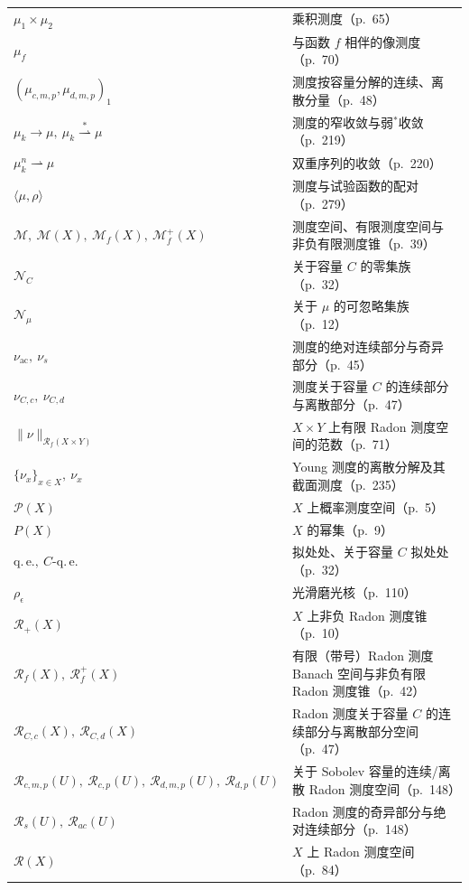 \documentclass[../main.tex]{subfiles}
\begin{document}
\begin{longtable}{p{}p{}}
$\mu_1\times\mu_2$ & 乘积测度（p.~65）\\
$\mu_f$ & 与函数 $f$ 相伴的像测度（p.~70）\\
$(\mu_{c,m,p},\mu_{d,m,p})_1$ & 测度按容量分解的连续、离散分量（p.~48）\\
$\mu_k\to\mu,\ \mu_k\stackrel{*}{\rightharpoonup}\mu$ & 测度的窄收敛与弱$^*$收敛（p.~219）\\
$\mu_k^n\rightharpoonup\mu$ & 双重序列的收敛（p.~220）\\
$\langle\mu,\rho\rangle$ & 测度与试验函数的配对（p.~279）\\
$\mathscr{M},\ \mathscr{M}(X),\ \mathscr{M}_f(X),\ \mathscr{M}_f^+(X)$ & 测度空间、有限测度空间与非负有限测度锥（p.~39）\\
$\mathcal{N}_C$ & 关于容量 $C$ 的零集族（p.~32）\\
$\mathcal{N}_\mu$ & 关于 $\mu$ 的可忽略集族（p.~12）\\
$\nu_{\mathrm{ac}},\ \nu_s$ & 测度的绝对连续部分与奇异部分（p.~45）\\
$\nu_{C,c},\ \nu_{C,d}$ & 测度关于容量 $C$ 的连续部分与离散部分（p.~47）\\
$\|\nu\|_{\mathscr{R}_f(X\times Y)}$ & $X\times Y$ 上有限 Radon 测度空间的范数（p.~71）\\
$\{\nu_x\}_{x\in X},\ \nu_x$ &  Young 测度的离散分解及其截面测度（p.~235）\\
$\mathcal{P}(X)$ & $X$ 上概率测度空间（p.~5）\\
$P(X)$ & $X$ 的幂集（p.~9）\\
$\mathrm{q.\,e.},\ C\text{-}\mathrm{q.\,e.}$ & 拟处处、关于容量 $C$ 拟处处（p.~32）\\
$\rho_\epsilon$ & 光滑磨光核（p.~110）\\
$\mathscr{R}_+(X)$ & $X$ 上非负 Radon 测度锥（p.~10）\\
$\mathscr{R}_f(X),\ \mathscr{R}_f^+(X)$ & 有限（带号）Radon 测度 Banach 空间与非负有限 Radon 测度锥（p.~42）\\
$\mathscr{R}_{C,c}(X),\ \mathscr{R}_{C,d}(X)$ & Radon 测度关于容量 $C$ 的连续部分与离散部分空间（p.~47）\\
$\mathscr{R}_{c,m,p}(U),\ \mathscr{R}_{c,p}(U),\ \mathscr{R}_{d,m,p}(U),\ \mathscr{R}_{d,p}(U)$ & 关于 Sobolev 容量的连续/离散 Radon 测度空间（p.~148）\\
$\mathscr{R}_s(U),\ \mathscr{R}_{ac}(U)$ & Radon 测度的奇异部分与绝对连续部分（p.~148）\\
$\mathscr{R}(X)$ & $X$ 上 Radon 测度空间（p.~84）\\

\end{longtable}
\end{document}
